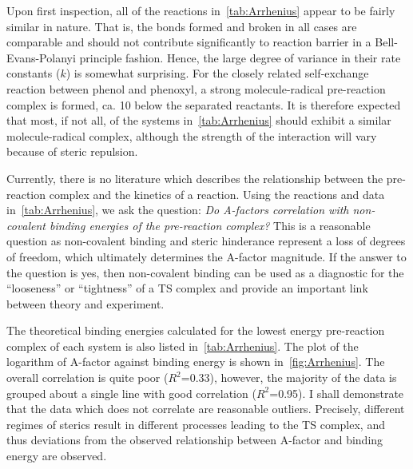 Upon first inspection, all of the reactions in~\ref{tab:Arrhenius} appear to be fairly similar in nature. That is, the bonds formed and broken in all cases are comparable and should not contribute significantly to reaction barrier in a Bell-Evans-Polanyi principle fashion. Hence, the large degree of variance in their rate constants ($k$) is somewhat surprising. For the closely related self-exchange reaction between phenol and phenoxyl,\cite{Mayer2002} a strong molecule-radical pre-reaction complex is formed, ca. 10 \kcalmol below the separated reactants. It is therefore expected that most, if not all, of the systems in~\ref{tab:Arrhenius} should exhibit a similar molecule-radical complex, although the strength of the interaction will vary because of steric repulsion.

Currently, there is no literature which describes the relationship between the pre-reaction complex and the kinetics of a reaction. Using the reactions and data in~\ref{tab:Arrhenius}, we ask the question: \emph{Do A-factors correlation with non-covalent binding energies of the pre-reaction complex?} This is a reasonable question as non-covalent binding and steric hinderance represent a loss of degrees of freedom, which ultimately determines the A-factor magnitude. If the answer to the question is yes, then non-covalent binding can be used as a diagnostic for the ``looseness'' or ``tightness'' of a TS complex and provide an important link between theory and experiment.

The theoretical binding energies calculated for the lowest energy pre-reaction complex of each system is also listed in~\ref{tab:Arrhenius}. The plot of the logarithm of A-factor against binding energy is shown in~\ref{fig:Arrhenius}. The overall correlation is quite poor ($R^2$=0.33), however, the majority of the data is grouped about a single line with good correlation ($R^2$=0.95). I shall demonstrate that the data which does not correlate are reasonable outliers. Precisely, different regimes of sterics result in different processes leading to the TS complex, and thus deviations from the observed relationship between A-factor and binding energy are observed.

% 
